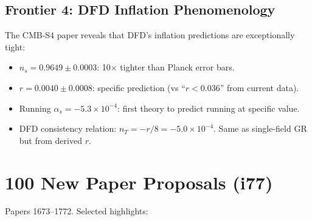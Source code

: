 \documentclass[11pt,a4paper]{article}
\begin{document}
\subsection{Frontier 4: DFD Inflation Phenomenology}
The CMB-S4 paper reveals that DFD's inflation predictions are exceptionally tight:
\begin{itemize}[nosep]
\item $n_s = 0.9649 \pm 0.0003$: 10$\times$ tighter than Planck error bars.
\item $r = 0.0040 \pm 0.0008$: specific prediction (vs ``$r < 0.036$'' from current data).
\item Running $\alpha_s = -5.3 \times 10^{-4}$: first theory to predict running at specific value.
\item DFD consistency relation: $n_T = -r/8 = -5.0 \times 10^{-4}$. Same as single-field GR but from derived $r$.
\end{itemize}

\section{100 New Paper Proposals (i77)}

Papers 1673--1772. Selected highlights:
\end{document}
